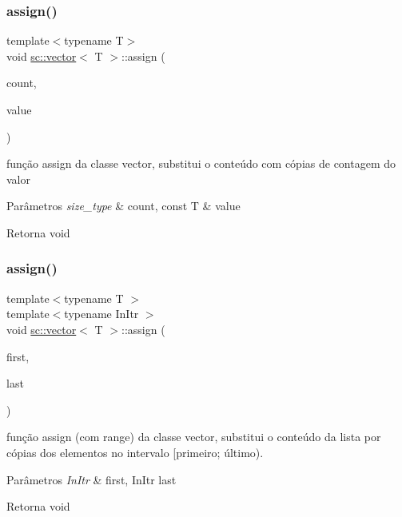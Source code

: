 \subsubsection{\texorpdfstring{assign()}{assign()}\hspace{0.1cm}{\footnotesize\ttfamily [1/7]}}
{\footnotesize\ttfamily template$<$typename T$>$ \\
void \mbox{\hyperlink{classsc_1_1vector}{sc\+::vector}}$<$ T $>$\+::assign (\begin{DoxyParamCaption}\item[{size\+\_\+type}]{count,  }\item[{const T \&}]{value }\end{DoxyParamCaption})}

função assign da classe vector, substitui o conteúdo com cópias de contagem do valor 
\begin{DoxyParams}{Parâmetros}
{\em size\+\_\+type} & count, const T \& value \\
\hline
\end{DoxyParams}
\begin{DoxyReturn}{Retorna}
void 
\end{DoxyReturn}
\mbox{\label{classsc_1_1vector_ab3e7f37e35c8a5206d069676540a2573}} 
\subsubsection{\texorpdfstring{assign()}{assign()}\hspace{0.1cm}{\footnotesize\ttfamily [2/7]}}
{\footnotesize\ttfamily template$<$typename T $>$ \\
template$<$typename In\+Itr $>$ \\
void \mbox{\hyperlink{classsc_1_1vector}{sc\+::vector}}$<$ T $>$\+::assign (\begin{DoxyParamCaption}\item[{In\+Itr}]{first,  }\item[{In\+Itr}]{last }\end{DoxyParamCaption})}

função assign (com range) da classe vector, substitui o conteúdo da lista por cópias dos elementos no intervalo \mbox{[}primeiro; último). 
\begin{DoxyParams}{Parâmetros}
{\em In\+Itr} & first, In\+Itr last \\
\hline
\end{DoxyParams}
\begin{DoxyReturn}{Retorna}
void 
\end{DoxyReturn}
\mbox{\label{classsc_1_1vector_a124042d2f64be269c9b5d03f90508d6e}} 
